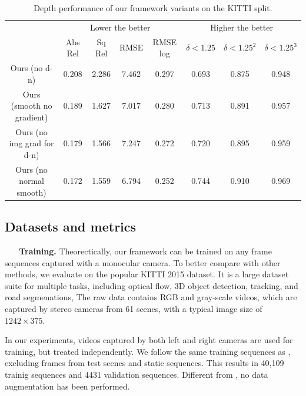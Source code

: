 \begin{table}[t]
\centering
\caption{Depth performance of our framework variants on the KITTI split.}
\label{tbl:ablation}
\fontsize{8}{9}\selectfont
\bgroup
\def\arraystretch{1.2}
\begin{tabular}{c|c|c|c|c|c|c|c}
\thickhline
\multirow{2}{*}{Methods}  & \multicolumn{4}{c|}{Lower the better} & \multicolumn{3}{c}{Higher the better}                  \\ \cline{2-8} 
                          & Abs Rel  & Sq Rel  & RMSE  & RMSE log & $\delta < 1.25$ & $\delta < 1.25^2$ & $\delta < 1.25^3$ \\ \hline
Ours (no d-n)             & 0.208    & 2.286   & 7.462 & 0.297    & 0.693           & 0.875             & 0.948             \\
Ours (smooth no gradient) & 0.189    & 1.627   & 7.017 & 0.280    & 0.713           & 0.891             & 0.957             \\
Ours (no img grad for d-n)    & 0.179    & 1.566   & 7.247 & 0.272    & 0.720           & 0.895             & 0.959             \\
Ours (no normal smooth)   & 0.172    & 1.559   & 6.794 & 0.252    & 0.744           & 0.910             & 0.969             \\ \hline
\end{tabular}
\egroup
\vspace{-0.7\baselineskip}
\end{table}

\vspace{-0.5\baselineskip}
\subsection{Datasets and metrics}
\vspace{-0.3\baselineskip}
\textbf{~~~Training.}
Theorectically, our framework can be trained on any frame sequences captured with a monocular camera. To better compare with other methods, we evaluate on the popular KITTI 2015 \cite{geiger2012we} dataset. It is a large dataset suite for multiple tasks, including optical flow, 3D object detection, tracking, and road segmenations, \etc The raw data contains RGB and gray-scale videos, which are captured by stereo cameras from 61 scenes, with a typical image size of $1242 \times 375$.

In our experiments, videos captured by both left and right cameras are used for training, but treated independently. We follow the same training sequences as \cite{zhou2017unsupervised,eigen2014depth}, excluding frames from test scenes and static sequences. This results in 40,109 trainig sequences and 4431 validation sequences. Different from \cite{godard2016unsupervised}, no data augmentation has been performed.

